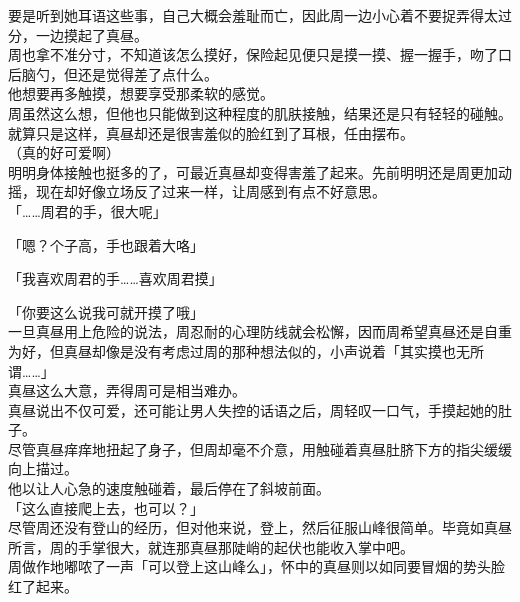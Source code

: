 要是听到她耳语这些事，自己大概会羞耻而亡，因此周一边小心着不要捉弄得太过分，一边摸起了真昼。\\

周也拿不准分寸，不知道该怎么摸好，保险起见便只是摸一摸、握一握手，吻了口后脑勺，但还是觉得差了点什么。\\

他想要再多触摸，想要享受那柔软的感觉。\\

周虽然这么想，但他也只能做到这种程度的肌肤接触，结果还是只有轻轻的碰触。\\

就算只是这样，真昼却还是很害羞似的脸红到了耳根，任由摆布。\\

（真的好可爱啊）\\

明明身体接触也挺多的了，可最近真昼却变得害羞了起来。先前明明还是周更加动摇，现在却好像立场反了过来一样，让周感到有点不好意思。\\

「……周君的手，很大呢」

「嗯？个子高，手也跟着大咯」

「我喜欢周君的手……喜欢周君摸」

「你要这么说我可就开摸了哦」\\

一旦真昼用上危险的说法，周忍耐的心理防线就会松懈，因而周希望真昼还是自重为好，但真昼却像是没有考虑过周的那种想法似的，小声说着「其实摸也无所谓……」\\

真昼这么大意，弄得周可是相当难办。\\

真昼说出不仅可爱，还可能让男人失控的话语之后，周轻叹一口气，手摸起她的肚子。\\

尽管真昼痒痒地扭起了身子，但周却毫不介意，用触碰着真昼肚脐下方的指尖缓缓向上描过。\\

他以让人心急的速度触碰着，最后停在了斜坡前面。\\

「这么直接爬上去，也可以？」\\

尽管周还没有登山的经历，但对他来说，登上，然后征服山峰很简单。毕竟如真昼所言，周的手掌很大，就连那真昼那陡峭的起伏也能收入掌中吧。\\

周做作地嘟哝了一声「可以登上这山峰么」，怀中的真昼则以如同要冒烟的势头脸红了起来。


